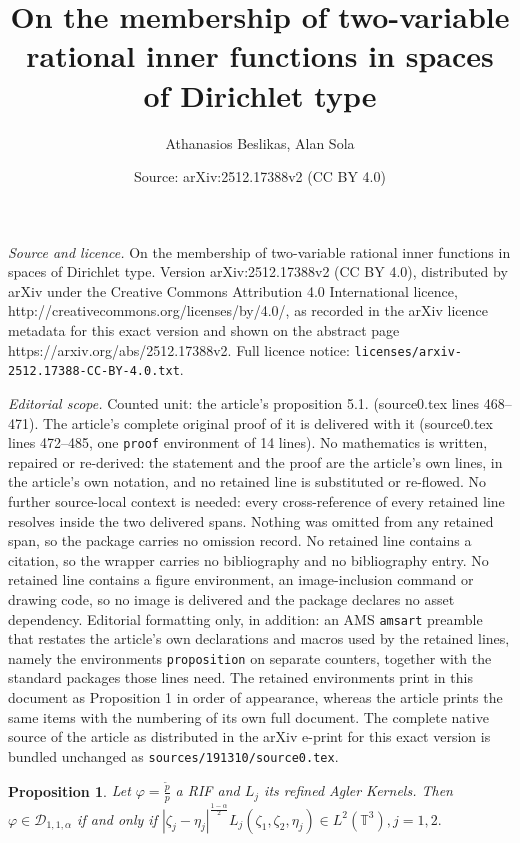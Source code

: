 \documentclass[10pt,a4paper]{amsart}
\title{On the membership of two-variable rational inner functions in spaces of Dirichlet type}
\author{Athanasios Beslikas, Alan Sola}
\date{Source: arXiv:2512.17388v2 (CC BY 4.0)}
\newtheorem{proposition}{Proposition}
\begin{document}
\maketitle

\noindent\emph{Source and licence.} On the membership of two-variable rational inner functions in spaces of Dirichlet type. Version arXiv:2512.17388v2 (CC BY 4.0), distributed by arXiv under the Creative Commons Attribution 4.0 International licence, http://creativecommons.org/licenses/by/4.0/, as recorded in the arXiv licence metadata for this exact version and shown on the abstract page https://arxiv.org/abs/2512.17388v2. Full licence notice: \texttt{licenses/arxiv-2512.17388-CC-BY-4.0.txt}.\par\smallskip

\noindent\textit{Editorial scope.} Counted unit: the article's proposition 5.1. (source0.tex lines 468--471). The article's complete original proof of it is delivered with it (source0.tex lines 472--485, one \texttt{proof} environment of 14 lines). No mathematics is written, repaired or re-derived: the statement and the proof are the article's own lines, in the article's own notation, and no retained line is substituted or re-flowed.  No further source-local context is needed: every cross-reference of every retained line resolves inside the two delivered spans.  Nothing was omitted from any retained span, so the package carries no omission record.  No retained line contains a citation, so the wrapper carries no bibliography and no bibliography entry.  No retained line contains a figure environment, an image-inclusion command or drawing code, so no image is delivered and the package declares no asset dependency.  Editorial formatting only, in addition: an AMS \texttt{amsart} preamble that restates the article's own declarations and macros used by the retained lines, namely the environments \texttt{proposition} on separate counters, together with the standard packages those lines need.  The retained environments print in this document as Proposition 1 in order of appearance, whereas the article prints the same items with the numbering of its own full document.  The complete native source of the article as distributed in the arXiv e-print for this exact version is bundled unchanged as \texttt{sources/191310/source0.tex}.
\begin{proposition} Let $\varphi=\frac{\tilde{p}}{p}$ a RIF and $L_j$ its refined Agler Kernels. Then $\varphi\in \mathcal{D}_{1,1,\alpha}$ if and only if
$|\zeta_j-\eta_j|^{\frac{1-\alpha}{2}}L_{j}(\zeta_1,\zeta_2,\eta_j)\in L^2(\mathbb{T}^3), j=1,2.$
\label{5.1.}
\end{proposition}
\end{document}
